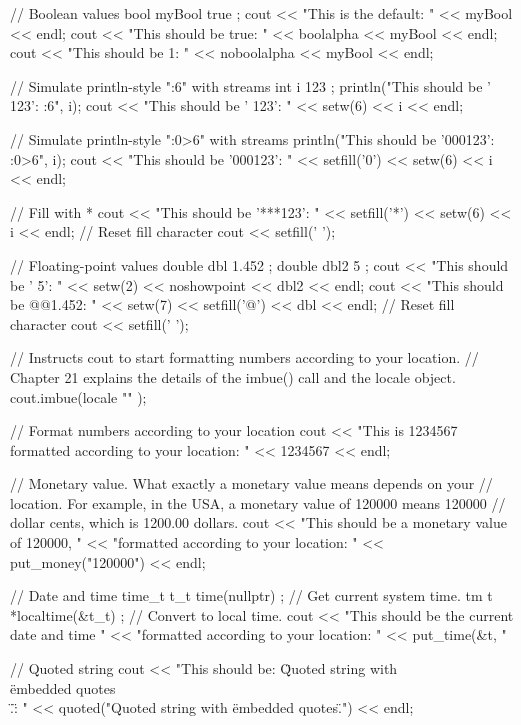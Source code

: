 \begin{cpp}
// Boolean values
bool myBool { true };
cout << "This is the default: " << myBool << endl;
cout << "This should be true: " << boolalpha << myBool << endl;
cout << "This should be 1: " << noboolalpha << myBool << endl;

// Simulate println-style "{:6}" with streams
int i { 123 };
println("This should be ' 123': {:6}", i);
cout << "This should be ' 123': " << setw(6) << i << endl;

// Simulate println-style "{:0>6}" with streams
println("This should be '000123': {:0>6}", i);
cout << "This should be '000123': " << setfill('0') << setw(6) << i << endl;

// Fill with *
cout << "This should be '***123': " << setfill('*') << setw(6) << i << endl;
// Reset fill character
cout << setfill(' ');

// Floating-point values
double dbl { 1.452 };
double dbl2 { 5 };
cout << "This should be ' 5': " << setw(2) << noshowpoint << dbl2 << endl;
cout << "This should be @@1.452: " << setw(7) << setfill('@') << dbl << endl;
// Reset fill character
cout << setfill(' ');

// Instructs cout to start formatting numbers according to your location.
// Chapter 21 explains the details of the imbue() call and the locale object.
cout.imbue(locale { "" });

// Format numbers according to your location
cout << "This is 1234567 formatted according to your location: " << 1234567
     << endl;

// Monetary value. What exactly a monetary value means depends on your
// location. For example, in the USA, a monetary value of 120000 means 120000
// dollar cents, which is 1200.00 dollars.
cout << "This should be a monetary value of 120000, "
     << "formatted according to your location: "
     << put_money("120000") << endl;

// Date and time
time_t t_t { time(nullptr) }; // Get current system time.
tm t { *localtime(&t_t) }; // Convert to local time.
cout << "This should be the current date and time "
     << "formatted according to your location: "
     << put_time(&t, "%

// Quoted string
cout << "This should be: \"Quoted string with \\\"embedded quotes\\\".\": "
     << quoted("Quoted string with \"embedded quotes\".") << endl;
\end{cpp}

